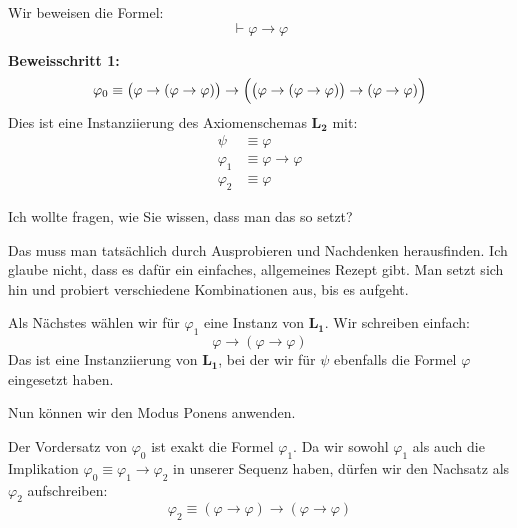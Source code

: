 \begin{math-stroke}
Wir beweisen die Formel:
\[ \vdash \varphi \rightarrow \varphi \]

\textbf{Beweisschritt 1:}
\begin{equation}\label{eq:phi0}
\varphi_0 \equiv \bigl(\varphi \rightarrow (\varphi \rightarrow \varphi)\bigr) \rightarrow \Bigl(\bigl(\varphi \rightarrow (\varphi \rightarrow \varphi)\bigr) \rightarrow (\varphi \rightarrow \varphi)\Bigr)
\end{equation}
Dies ist eine Instanziierung des Axiomenschemas $\mathbf{L_2}$ mit:
\begin{align*}
\psi &\equiv \varphi \\
\varphi_1 &\equiv \varphi \rightarrow \varphi \\
\varphi_2 &\equiv \varphi
\end{align*}
\end{math-stroke}

\begin{student-interaction}[Studentenfrage]
Ich wollte fragen, wie Sie wissen, dass man das so setzt?
\end{student-interaction}

\begin{spoken-clean}[continued]
Das muss man tatsächlich durch Ausprobieren und Nachdenken herausfinden. Ich glaube nicht, dass es dafür ein einfaches, allgemeines Rezept gibt. Man setzt sich hin und probiert verschiedene Kombinationen aus, bis es aufgeht. 

Als Nächstes wählen wir für $\varphi_1$ eine Instanz von $\mathbf{L_1}$. Wir schreiben einfach:
\[ \varphi \rightarrow (\varphi \rightarrow \varphi) \]
Das ist eine Instanziierung von $\mathbf{L_1}$, bei der wir für $\psi$ ebenfalls die Formel $\varphi$ eingesetzt haben. 

Nun können wir den Modus Ponens anwenden. 

Der Vordersatz von $\varphi_0$ ist exakt die Formel $\varphi_1$. Da wir sowohl $\varphi_1$ als auch die Implikation $\varphi_0 \equiv \varphi_1 \rightarrow \varphi_2$ in unserer Sequenz haben, dürfen wir den Nachsatz als $\varphi_2$ aufschreiben:
\[ \varphi_2 \equiv (\varphi \rightarrow \varphi) \rightarrow (\varphi \rightarrow \varphi) \]
\end{spoken-clean}

